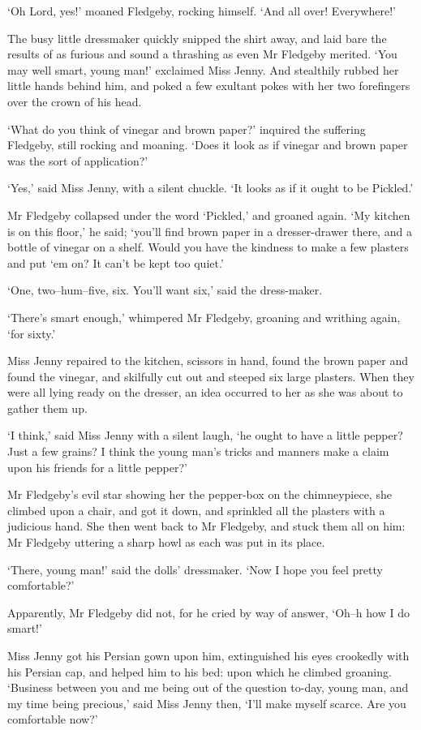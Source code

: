 ‘Oh Lord, yes!’ moaned Fledgeby, rocking himself. ‘And all over!
Everywhere!’

The busy little dressmaker quickly snipped the shirt away, and laid
bare the results of as furious and sound a thrashing as even Mr Fledgeby
merited. ‘You may well smart, young man!’ exclaimed Miss Jenny. And
stealthily rubbed her little hands behind him, and poked a few exultant
pokes with her two forefingers over the crown of his head.

‘What do you think of vinegar and brown paper?’ inquired the suffering
Fledgeby, still rocking and moaning. ‘Does it look as if vinegar and
brown paper was the sort of application?’

‘Yes,’ said Miss Jenny, with a silent chuckle. ‘It looks as if it ought
to be Pickled.’

Mr Fledgeby collapsed under the word ‘Pickled,’ and groaned again.
‘My kitchen is on this floor,’ he said; ‘you’ll find brown paper in a
dresser-drawer there, and a bottle of vinegar on a shelf. Would you have
the kindness to make a few plasters and put ‘em on? It can’t be kept too
quiet.’

‘One, two--hum--five, six. You’ll want six,’ said the dress-maker.

‘There’s smart enough,’ whimpered Mr Fledgeby, groaning and writhing
again, ‘for sixty.’

Miss Jenny repaired to the kitchen, scissors in hand, found the brown
paper and found the vinegar, and skilfully cut out and steeped six
large plasters. When they were all lying ready on the dresser, an idea
occurred to her as she was about to gather them up.

‘I think,’ said Miss Jenny with a silent laugh, ‘he ought to have a
little pepper? Just a few grains? I think the young man’s tricks and
manners make a claim upon his friends for a little pepper?’

Mr Fledgeby’s evil star showing her the pepper-box on the chimneypiece,
she climbed upon a chair, and got it down, and sprinkled all the
plasters with a judicious hand. She then went back to Mr Fledgeby, and
stuck them all on him: Mr Fledgeby uttering a sharp howl as each was put
in its place.

‘There, young man!’ said the dolls’ dressmaker. ‘Now I hope you feel
pretty comfortable?’

Apparently, Mr Fledgeby did not, for he cried by way of answer, ‘Oh--h
how I do smart!’

Miss Jenny got his Persian gown upon him, extinguished his eyes
crookedly with his Persian cap, and helped him to his bed: upon which he
climbed groaning. ‘Business between you and me being out of the question
to-day, young man, and my time being precious,’ said Miss Jenny then,
‘I’ll make myself scarce. Are you comfortable now?’

